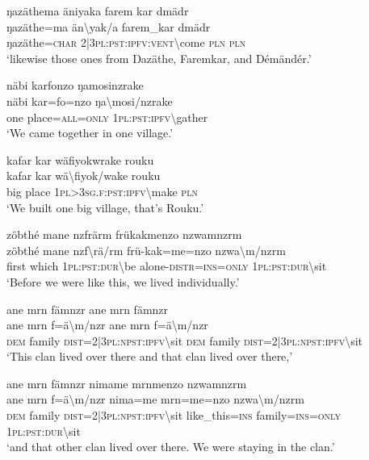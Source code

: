 \ea\label{ex:2:a1715}
ŋazäthema äniyaka farem kar dmädr\\
\gll ŋazäthe=ma	än{\textbackslash}yak/a	farem\_kar	dmädr\\
     ŋazäthe=\textsc{char}	2|3\textsc{pl}:\textsc{pst}:\textsc{ipfv}:\textsc{vent}{\textbackslash}come	\textsc{pln}	\textsc{pln}\\
\glt `likewise those ones from Ŋazäthe, Faremkar, and Démändér.'
\z

\ea\label{ex:2:a1718}
näbi karfonzo ŋamosinzrake\\
\gll näbi	kar=fo=nzo	ŋa{\textbackslash}mosi/nzrake\\
     one	place=\textsc{all}=\textsc{only}	1\textsc{pl}:\textsc{pst}:\textsc{ipfv}{\textbackslash}gather\\
\glt `We came together in one village.'
\z

\ea\label{ex:2:a1719}
kafar kar wäfiyokwrake rouku\\
\gll kafar	kar	wä{\textbackslash}fiyok/wake	rouku\\
     big	place	1\textsc{pl}>3\textsc{sg}.\textsc{f}:\textsc{pst}:\textsc{ipfv}{\textbackslash}make	\textsc{pln}\\
\glt `We built one big village, that's Rouku.'
\z

\ea\label{ex:2:a1720}
zöbthé mane nzfrärm frükakmenzo nzwamnzrm\\
\gll zöbthé	mane	nzf{\textbackslash}rä/rm	frü-kak=me=nzo	nzwa{\textbackslash}m/nzrm\\
     first	which	1\textsc{pl}:\textsc{pst}:\textsc{dur}{\textbackslash}be	alone-\textsc{distr}=\textsc{ins}=\textsc{only}	1\textsc{pl}:\textsc{pst}:\textsc{dur}{\textbackslash}sit\\
\glt `Before we were like this, we lived individually.'
\z

\ea\label{ex:2:a1722}
ane mrn fämnzr ane mrn fämnzr\\
\gll ane	mrn	f=ä{\textbackslash}m/nzr	ane	mrn	f=ä{\textbackslash}m/nzr\\
     \textsc{dem}	family	\textsc{dist}=2|3\textsc{pl}:\textsc{npst}:\textsc{ipfv}{\textbackslash}sit	\textsc{dem}	family	\textsc{dist}=2|3\textsc{pl}:\textsc{npst}:\textsc{ipfv}{\textbackslash}sit\\
\glt `This clan lived over there and that clan lived over there,'
\z

\ea\label{ex:2:a1724}
ane mrn fämnzr nimame mrnmenzo nzwamnzrm\\
\gll ane	mrn	f=ä{\textbackslash}m/nzr	nima=me	mrn=me=nzo	nzwa{\textbackslash}m/nzrm\\
     \textsc{dem}	family	\textsc{dist}=2|3\textsc{pl}:\textsc{npst}:\textsc{ipfv}{\textbackslash}sit	like\_this=\textsc{ins}	family=\textsc{ins}=\textsc{only}	1\textsc{pl}:\textsc{pst}:\textsc{dur}{\textbackslash}sit\\
\glt `and that other clan lived over there. We were staying in the clan.'
\z

